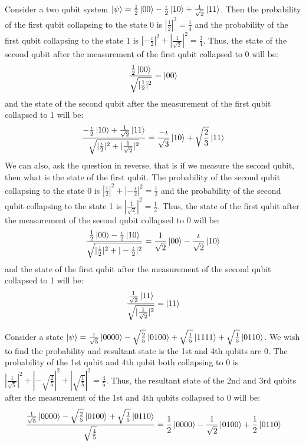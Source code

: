\begin{example}
    Consider a two qubit system $\ket{\psi}=\frac{1}{2}\ket{00}-\frac{\iota}{2}\ket{10}+\frac{1}{\sqrt{2}}\ket{11}$.
    Then the probability of the first qubit collapsing to the state 0 is $|\frac{1}{2}|^2=\frac{1}{4}$ and the probability of the first qubit collapsing to the state 1 is $|-\frac{\iota}{2}|^2+|\frac{1}{\sqrt{2}}|^2=\frac{3}{4}$.
    Thus, the state of the second qubit after the measurement of the first qubit collapsed to 0 will be:
    \[
        \dfrac{\frac{1}{2}\ket{00}}{\sqrt{|\frac{1}{2}|^2}}=\ket{00}
    \]
    and the state of the second qubit after the measurement of the first qubit collapsed to 1 will be:
    \[
        \dfrac{-\frac{\iota}{2}\ket{10}+\frac{1}{\sqrt{2}}\ket{11}}{\sqrt{|\frac{\iota}{2}|^2+|\frac{1}{\sqrt{2}}|^2}}=\frac{-\iota}{\sqrt{3}}\ket{10}+\sqrt{\frac{2}{3}}\ket{11}
    \]
    We can also, ask the question in reverse, that is if we measure the second qubit, then what is the state of the first qubit. 
    The probability of the second qubit collapsing to the state 0 is $|\frac{1}{2}|^2+|-\frac{\iota}{2}|^2=\frac{1}{2}$ and the probability of the second qubit collapsing to the state 1 is $|\frac{1}{\sqrt{2}}|^2=\frac{1}{2}$.
    Thus, the state of the first qubit after the measurement of the second qubit collapsed to 0 will be:
    \[
        \dfrac{\frac{1}{2}\ket{00}-\frac{\iota}{2}\ket{10}}{\sqrt{|\frac{1}{2}|^2+|-\frac{\iota}{2}|^2}}=\frac{1}{\sqrt{2}}\ket{00}-\frac{\iota}{\sqrt{2}}\ket{10}
    \]
    and the state of the first qubit after the measurement of the second qubit collapsed to 1 will be:
    \[
        \dfrac{\frac{1}{\sqrt{2}}\ket{11}}{\sqrt{|\frac{1}{\sqrt{2}}|^2}}=\ket{11}
    \]
\end{example}

\begin{example}
    Consider a state $\ket{\psi}=\frac{1}{\sqrt{5}}\ket{0000}-\sqrt{\frac{2}{5}}\ket{0100} +\sqrt{\frac{1}{5}}\ket{1111}+\sqrt{\frac{1}{5}}\ket{0110}$.
    We wish to find the probability and resultant state is the 1st and 4th qubits are 0.
    The probability of the 1st qubit and 4th qubit both collapsing to 0 is $|\frac{1}{\sqrt{5}}|^2+|-\sqrt{\frac{2}{5}}|^2+|\sqrt{\frac{1}{5}}|^2=\frac{4}{5}$.
    Thus, the resultant state of the 2nd and 3rd qubits after the measurement of the 1st and 4th qubits collapsed to 0 will be:
    \[
        \dfrac{\frac{1}{\sqrt{5}}\ket{0000}-\sqrt{\frac{2}{5}}\ket{0100}+\sqrt{\frac{1}{5}}\ket{0110}}{\sqrt{\frac{4}{5}}}=\frac{1}{2}\ket{0000}-\frac{1}{\sqrt{2}}\ket{0100}+\frac{1}{2}\ket{0110}
    \] 
\end{example}

